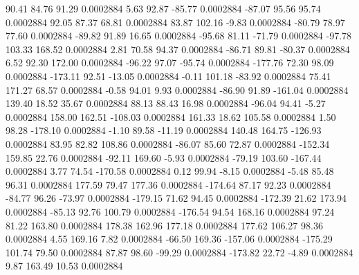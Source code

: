        90.41       84.76       91.29     0.0002884
        5.63       92.87      -85.77     0.0002884
      -87.07       95.56       95.74     0.0002884
       92.05       87.37       68.81     0.0002884
       83.87      102.16       -9.83     0.0002884
      -80.79       78.97       77.60     0.0002884
      -89.82       91.89       16.65     0.0002884
      -95.68       81.11      -71.79     0.0002884
      -97.78      103.33      168.52     0.0002884
        2.81       70.58       94.37     0.0002884
      -86.71       89.81      -80.37     0.0002884
        6.52       92.30      172.00     0.0002884
      -96.22       97.07      -95.74     0.0002884
     -177.76       72.30       98.09     0.0002884
     -173.11       92.51      -13.05     0.0002884
       -0.11      101.18      -83.92     0.0002884
       75.41      171.27       68.57     0.0002884
       -0.58       94.01        9.93     0.0002884
      -86.90       91.89     -161.04     0.0002884
      139.40       18.52       35.67     0.0002884
       88.13       88.43       16.98     0.0002884
      -96.04       94.41       -5.27     0.0002884
      158.00      162.51     -108.03     0.0002884
      161.33       18.62      105.58     0.0002884
        1.50       98.28     -178.10     0.0002884
       -1.10       89.58      -11.19     0.0002884
      140.48      164.75     -126.93     0.0002884
       83.95       82.82      108.86     0.0002884
      -86.07       85.60       72.87     0.0002884
     -152.34      159.85       22.76     0.0002884
      -92.11      169.60       -5.93     0.0002884
      -79.19      103.60     -167.44     0.0002884
        3.77       74.54     -170.58     0.0002884
        0.12       99.94       -8.15     0.0002884
       -5.48       85.48       96.31     0.0002884
      177.59       79.47      177.36     0.0002884
     -174.64       87.17       92.23     0.0002884
      -84.77       96.26      -73.97     0.0002884
     -179.15       71.62       94.45     0.0002884
     -172.39       21.62      173.94     0.0002884
      -85.13       92.76      100.79     0.0002884
     -176.54       94.54      168.16     0.0002884
       97.24       81.22      163.80     0.0002884
      178.38      162.96      177.18     0.0002884
      177.62      106.27       98.36     0.0002884
        4.55      169.16        7.82     0.0002884
      -66.50      169.36     -157.06     0.0002884
     -175.29      101.74       79.50     0.0002884
       87.87       98.60      -99.29     0.0002884
     -173.82       22.72       -4.89     0.0002884
        9.87      163.49       10.53     0.0002884
